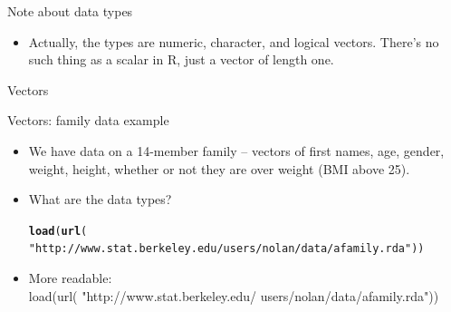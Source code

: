 \documentclass{beamer}\usepackage[]{graphicx}\usepackage[]{color}
\makeatletter
\newcommand{\hlstr}[1]{\textcolor[rgb]{0.192,0.494,0.8}{#1}}%
\newcommand{\hlstd}[1]{\textcolor[rgb]{0.345,0.345,0.345}{#1}}%
\newcommand{\hlkwd}[1]{\textcolor[rgb]{0.737,0.353,0.396}{\textbf{#1}}}%
\newenvironment{kframe}{%
 \def\at@end@of@kframe{}%
 \ifinner\ifhmode%
  \def\at@end@of@kframe{\end{minipage}}%
  \begin{minipage}{\columnwidth}%
 \fi\fi%
 \def\FrameCommand##1{\hskip\@totalleftmargin \hskip-\fboxsep
 \colorbox{shadecolor}{##1}\hskip-\fboxsep
     \hskip-\linewidth \hskip-\@totalleftmargin \hskip\columnwidth}%
 \MakeFramed {\advance\hsize-\width
   \@totalleftmargin\z@ \linewidth\hsize
   \@setminipage}}%
 {\par\unskip\endMakeFramed%
 \at@end@of@kframe}
\newenvironment{knitrout}{}{} %
\renewenvironment{knitrout}{\begin{singlespace}}{\end{singlespace}}
\theoremstyle{mystyle}
\makeatother
\begin{document}
\begin{frame}{Note about data types}
\begin{itemize}
\item Actually, the types are numeric, character, and logical vectors.  There’s no such thing as a scalar in R, just a vector of length one.
\end{itemize}
\end{frame}

\begin{frame}[fragile]{Vectors}
\begin{center}
    {{\resizebox*{1.1\textwidth}{1.1\textheight}
        {}} \par}
  \end{center}
\end{frame}

\begin{frame}[fragile]{Vectors: family data example}
\begin{itemize}
\item We have data on a 14-member family – vectors of first names, age, gender, weight, height, whether or not they are over weight (BMI above 25).
\item What are the data types?
\begin{knitrout}
\color{fgcolor}\begin{kframe}
\begin{alltt}
\hlkwd{load}\hlstd{(}\hlkwd{url}\hlstd{(}
  \hlstr{"http://www.stat.berkeley.edu/users/nolan/data/afamily.rda"}\hlstd{))}
\end{alltt}
\end{kframe}
\end{knitrout}
\item More readable:\\ load(url(
"http://www.stat.berkeley.edu/
users/nolan/data/afamily.rda"))
\end{itemize}
\end{frame}
\end{document}
